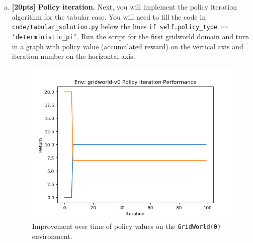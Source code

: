 \documentclass{article}
\begin{document}
\begin{enumerate}[(a)]

\item {\bf [20pts] Policy iteration.} Next, you will implement the policy iteration algorithm for the tabular case. You will need to fill the code in \texttt{code/tabular\_solution.py} below the lines \texttt{if self.policy\_type == `deterministic\_pi'}. Run the script for the first gridworld domain and turn in a graph with policy value (accumulated reward) on the vertical axis and iteration number on the horizontal axis.

\begin{figure}[h!]
        \centering
        \includegraphics[width=\textwidth]{../figures/gridworld-v0_deterministic_pi.png}
        \caption{Improvement over time of policy values on the \texttt{GridWorld(0)} environment.}
\end{figure}



\end{enumerate}


\newpage 
{}
\end{document}
